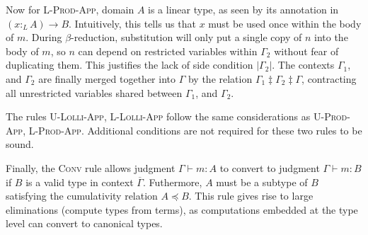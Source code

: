 \documentclass[sigplan,screen]{acmart}
\theoremstyle{definition}
\newcommand{\rname}[1]{\textsc{\footnotesize #1}}
\newcommand{\pure}[1]{|#1|}
\newcommand{\ltype}{:_{\scriptscriptstyle L}}
\newcommand{\mrg}[3]{#1\ddagger#2\ddagger#3}
\begin{document}
  Now for \rname{L-Prod-App}, domain $A$ is a linear type, as seen by its annotation in $(x \ltype A) \rightarrow B$. Intuitively, this tells us that $x$ must be used once within the body of $m$. During $\beta$-reduction, substitution will only put a single copy of $n$ into the body of $m$, so $n$ can depend on restricted variables within $\Gamma_2$ without fear of duplicating them. This justifies the lack of side condition $\pure{\Gamma_2}$. The contexts $\Gamma_1$, and $\Gamma_2$ are finally merged together into $\Gamma$ by the relation $\mrg{\Gamma_1}{\Gamma_2}{\Gamma}$, contracting all unrestricted variables shared between $\Gamma_1$, and $\Gamma_2$.

  The rules \rname{U-Lolli-App}, \rname{L-Lolli-App} follow the same considerations as \rname{U-Prod-App}, \rname{L-Prod-App}. Additional conditions are not required for these two rules to be sound.

  Finally, the \rname{Conv} rule allows judgment $\Gamma \vdash m : A$ to convert to judgment $\Gamma \vdash m : B$ if $B$ is a valid type in context $\overline{\Gamma}$. Futhermore, $A$ must be a subtype of $B$ satisfying the cumulativity relation $A \preceq B$. This rule gives rise to large eliminations (compute types from terms), as computations embedded at the type level can convert to canonical types.
\end{document}
